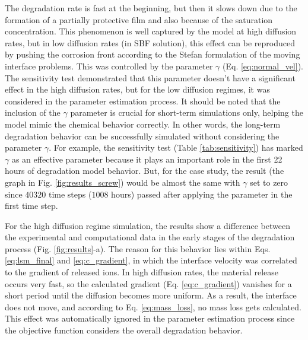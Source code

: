 The degradation rate is fast at the beginning, but then it slows down due to the formation of a partially protective film and also because of the saturation concentration. This phenomenon is well captured by the model at high diffusion rates, but in low diffusion rates (in {SBF} solution), this effect can be reproduced by pushing the corrosion front according to the Stefan formulation of the moving interface problems. This was controlled by the parameter $\gamma$ (Eq. \ref{eq:normal_vel}). The sensitivity test demonstrated that this parameter doesn't have a significant effect in the high diffusion rates, but for the low diffusion regimes, it was considered in the parameter estimation process.
It should be noted that the inclusion of the $\gamma$ parameter is crucial for short-term simulations only, helping the model mimic the chemical behavior correctly.
In other words, the long-term degradation behavior can be successfully simulated without considering the parameter $\gamma$. For example, the sensitivity test (Table \ref{tab:sensitivity}) has marked $\gamma$ as an effective parameter because it plays an important role in the first 22 hours of degradation model behavior. But, for the case study, the result (the graph in Fig. \ref{fig:results_screw}) would be almost the same with $\gamma$ set to zero since $\num{40320}$ time steps ($\num{1008}$ hours) passed after applying the parameter in the first time step.

For the high diffusion regime simulation, the results show a difference between the experimental and computational data in the early stages of the degradation process (Fig. \ref{fig:results}-a). The reason for this behavior lies within Eqs. \ref{eq:lsm_final} and \ref{eq:c_gradient}, in which the interface velocity was correlated to the gradient of released ions. In high diffusion rates, the material release occurs very fast, so the calculated gradient (Eq. \ref{eq:c_gradient}) vanishes for a short period until the diffusion becomes more uniform. As a result, the interface does not move, and according to Eq. \ref{eq:mass_loss}, no mass loss gets calculated. This effect was automatically ignored in the parameter estimation process since the objective function considers the overall degradation behavior.

